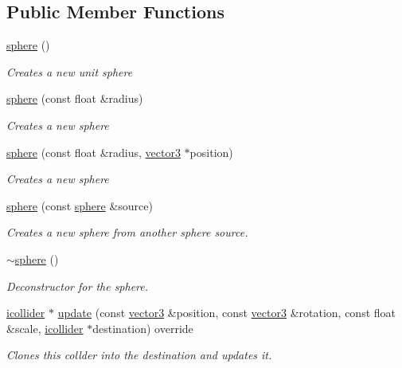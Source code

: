 \subsection*{Public Member Functions}
\begin{DoxyCompactItemize}
\item 
\hyperlink{classflounder_1_1sphere_a99e656a77996015079eb9744db5d7330}{sphere} ()
\begin{DoxyCompactList}\small\item\em Creates a new unit sphere \end{DoxyCompactList}\item 
\hyperlink{classflounder_1_1sphere_ad6598fc632cabc8a516cef89f1f0cae9}{sphere} (const float \&radius)
\begin{DoxyCompactList}\small\item\em Creates a new sphere \end{DoxyCompactList}\item 
\hyperlink{classflounder_1_1sphere_a760cbc4b1b1dc51e47813b4c0d0b489d}{sphere} (const float \&radius, \hyperlink{classflounder_1_1vector3}{vector3} $\ast$position)
\begin{DoxyCompactList}\small\item\em Creates a new sphere \end{DoxyCompactList}\item 
\hyperlink{classflounder_1_1sphere_aa1ae44ea868f8884908eec5f6250032e}{sphere} (const \hyperlink{classflounder_1_1sphere}{sphere} \&source)
\begin{DoxyCompactList}\small\item\em Creates a new sphere from another sphere source. \end{DoxyCompactList}\item 
\hyperlink{classflounder_1_1sphere_ab6f5bcdd6c9f36e582aab2e267b1abcf}{$\sim$sphere} ()
\begin{DoxyCompactList}\small\item\em Deconstructor for the sphere. \end{DoxyCompactList}\item 
\hyperlink{classflounder_1_1icollider}{icollider} $\ast$ \hyperlink{classflounder_1_1sphere_a9037b54ff10e6497a13f9836a77816fd}{update} (const \hyperlink{classflounder_1_1vector3}{vector3} \&position, const \hyperlink{classflounder_1_1vector3}{vector3} \&rotation, const float \&scale, \hyperlink{classflounder_1_1icollider}{icollider} $\ast$destination) override
\begin{DoxyCompactList}\small\item\em Clones this collder into the destination and updates it. \end{DoxyCompactList}\item 

\end{DoxyCompactItemize}
